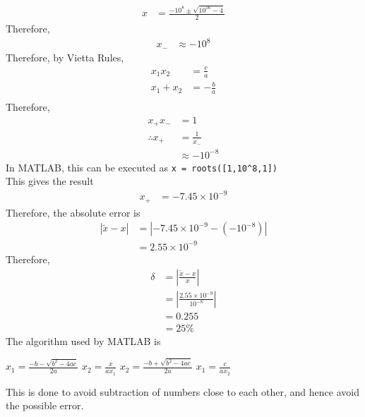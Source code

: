 \documentclass[fleqn, a4paper, 12pt, twoside]{article}
\theoremstyle{definition}
\theoremstyle{theorem}
\renewcommand{\tilde}{\widetilde}
\begin{document}
\begin{solution}
	\begin{align*}
		x & = \frac{-10^8 \pm \sqrt{10^{16} - 4}}{2}
	\end{align*}
	Therefore,
	\begin{align*}
		x_{-} & \approx -10^8
	\end{align*}
	Therefore, by Vietta Rules,
	\begin{align*}
		x_1 x_2   & = \frac{c}{a}  \\
		x_1 + x_2 & = -\frac{b}{a} \\
	\end{align*}
	Therefore,
	\begin{align*}
		x_{+} x_{-}      & = 1               \\
		\therefore x_{+} & = \frac{1}{x_{-}} \\
                                 & \approx -10^{-8}
	\end{align*}
	In MATLAB, this can be executed as \lstinline!x = roots([1,10^8,1])!\\
	This gives the result
	\begin{align*}
		x_{+} & = -7.45 \times 10^{-9}
	\end{align*}
	Therefore, the absolute error is
	\begin{align*}
		\left| \tilde{x} - x \right| & = \left| -7.45 \times 10^{-9} - \left( -10^{-8} \right) \right| \\
                                             & = 2.55 \times 10^{-9}
	\end{align*}
	Therefore,
	\begin{align*}
		\delta & = \left| \frac{\tilde{x} - x}{x} \right|             \\
                       & = \left| \frac{2.55 \times 10^{-9}}{10^{-8}} \right| \\
                       & = 0.255                                              \\
                       & = 25 \%
	\end{align*}
	The algorithm used by MATLAB is
	\begin{algorithmic}
			\State $x_1 = \frac{-b - \sqrt{b^2 - 4 a c}}{2 a}$
			\State $x_2 = \frac{x}{a x_1}$
		\Else
			\State $x_2 = \frac{-b + \sqrt{b^2 - 4 a c}}{2 a}$
			\State $x_1 = \frac{c}{a x_2}$
		\EndIf
	\end{algorithmic}
	This is done to avoid subtraction of numbers close to each other, and hence avoid the possible error.
\end{solution}
\end{document}
